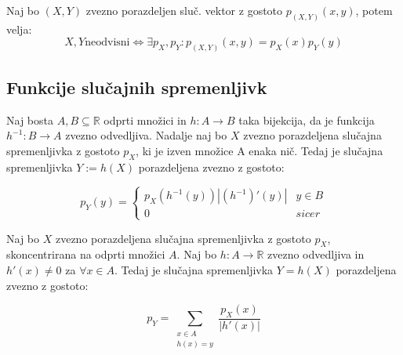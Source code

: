 \begin{multicols}{4}
Naj bo $(X, Y)$ zvezno porazdeljen sluč. vektor z gostoto $ p_{(X, Y)}(x,y)$, potem velja:
\[ X, Y \text{neodvisni} \iff \exists p_X, p_Y: p_{(X,Y)}(x,y) = p_X(x) p_Y(y)\]

\subsection{Funkcije slučajnih spremenljivk}
Naj bosta $A, B \subseteq \mathbb{R}$ odprti množici in $h: A \to B$ taka bijekcija, da je funkcija
$h^{-1}: B \to A$ zvezno odvedljiva. Nadalje naj bo $X$ zvezno porazdeljena slučajna
spremenljivka z gostoto $p_X$, ki je izven množice A enaka nič. Tedaj je slučajna
spremenljivka $Y := h(X)$ porazdeljena zvezno z gostoto:

\[ p_Y(y) = \begin{cases}
	p_X\left( h^{-1}(y) \right) \left|(h^{-1})'(y)\right| & y \in B \\
	0 & sicer	
\end{cases}\]

Naj bo $X$ zvezno porazdeljena slučajna spremenljivka z gostoto $p_X$, skoncentrirana na odprti množici $A$. Naj bo $h: A \to \mathbb{R}$ zvezno odvedljiva in $h'(x) \neq 0$ za $\forall x \in A$. 
Tedaj je slučajna spremenljivka $Y = h(X)$ porazdeljena zvezno z gostoto:

\[ p_Y = \sum_{\substack{x \in A \\ h(x) = y}} \frac{p_X(x)}{|h'(x)|}\]


\end{multicols}

